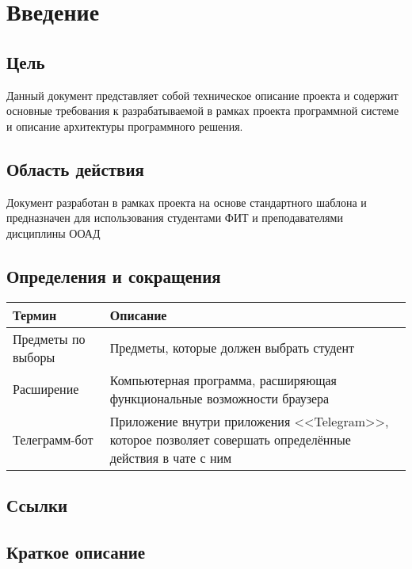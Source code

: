 \chapter{Введение}
	\section{Цель}
		Данный документ представляет собой техническое описание проекта \ProjectName и содержит основные требования к разрабатываемой в рамках проекта программной системе и описание архитектуры программного решения.
	\section{Область действия}
		Документ разработан в рамках проекта \ProjectName на основе стандартного шаблона и предназначен для использования студентами ФИТ и преподавателями дисциплины ООАД
	\section{Определения и сокращения}
		\begin{tabularx}{\textwidth}{
				| >{\centering\arraybackslash\hsize=5cm}X
				| >{\centering\arraybackslash}X
				|}\hline
			\textbf{Термин} & \textbf{Описание} \\\hline
			Предметы по выборы & Предметы, которые должен выбрать студент  \\\hline
			Расширение & Компьютерная программа, расширяющая функциональные возможности браузера \\\hline
			Телеграмм-бот & Приложение внутри приложения <<Telegram>>, которое позволяет совершать определённые действия в чате с ним \\\hline
		\end{tabularx}
	\section{Ссылки}

	\section{Краткое описание}
